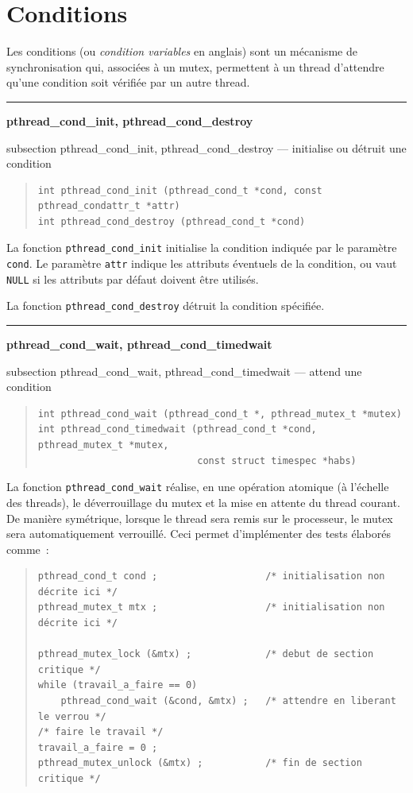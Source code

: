 \documentclass [twoside] {report}
\newcommand {\primitive} [1]
    {
	\phantomsection
	{\large \textbf {#1}}
	\addcontentsline {toc} {subsection} {#1}
    }
\newcommand {\separation}
    {
	\vspace {5mm}
	\nopagebreak
	\hrule
    }
\begin{document}
\section {Conditions}

Les conditions (ou \textit {condition variables} en anglais) sont un
mécanisme de synchronisation qui, associées à un mutex, permettent à
un thread d'attendre qu'une condition soit vérifiée par un autre thread.


\separation
\primitive {pthread\_cond\_init, pthread\_cond\_destroy} --- initialise ou détruit une condition

\begin {quote}
\begin {verbatim}
int pthread_cond_init (pthread_cond_t *cond, const pthread_condattr_t *attr)
int pthread_cond_destroy (pthread_cond_t *cond)
\end{verbatim}
\end {quote}

La fonction \verb|pthread_cond_init| initialise la condition indiquée
par le paramètre \texttt {cond}.  Le paramètre \texttt {attr} indique
les attributs éventuels de la condition, ou vaut \texttt {NULL} si les
attributs par défaut doivent être utilisés.

La fonction \verb|pthread_cond_destroy| détruit la condition spécifiée.


\separation
\primitive {pthread\_cond\_wait, pthread\_cond\_timedwait} --- attend une condition

\begin {quote}
\begin {verbatim}
int pthread_cond_wait (pthread_cond_t *, pthread_mutex_t *mutex)
int pthread_cond_timedwait (pthread_cond_t *cond, pthread_mutex_t *mutex,
                            const struct timespec *habs)
\end{verbatim}
\end {quote}

La fonction \verb|pthread_cond_wait| réalise, en une opération atomique
(à l'échelle des threads), le déverrouillage du mutex et la mise en
attente du thread courant. De manière symétrique, lorsque le thread
sera remis sur le processeur, le mutex sera automatiquement verrouillé.
Ceci permet d'implémenter des tests élaborés comme~:

\begin {quote}
\small
\begin {verbatim}
pthread_cond_t cond ;                   /* initialisation non décrite ici */
pthread_mutex_t mtx ;                   /* initialisation non décrite ici */

pthread_mutex_lock (&mtx) ;             /* debut de section critique */
while (travail_a_faire == 0)
    pthread_cond_wait (&cond, &mtx) ;   /* attendre en liberant le verrou */
/* faire le travail */
travail_a_faire = 0 ;
pthread_mutex_unlock (&mtx) ;           /* fin de section critique */
\end{verbatim}
\end {quote}
\end{document}
